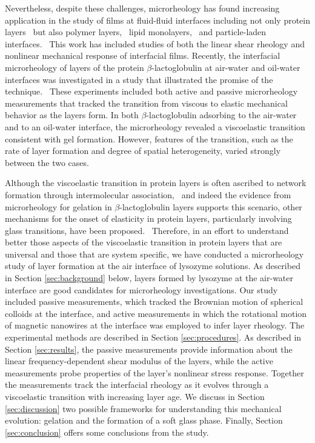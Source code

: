 Nevertheless, despite these challenges, microrheology has found increasing application in the study of films at fluid-fluid interfaces including not only protein layers~\cite{Lee2009, Lee2010, Lee2011, Dhar2010, Prasad2006} but also polymer layers,~\cite{Helfer2001, Kandar2010, Maestro2011} lipid monolayers,~\cite{Sickert2007, Choi2011, Kim2011, Park2011, Murakami2010} and particle-laden interfaces.~\cite{Wu2009a, Langer2012}  This work has included studies of both the linear shear rheology and nonlinear mechanical response of interfacial films.  Recently, the interfacial microrheology of layers of the protein $\beta$-lactoglobulin  at air-water and oil-water interfaces was investigated in a study that illustrated the promise of the technique.~\cite{Lee2010, Lee2011}  These experiments included both active and passive microrheology measurements that tracked the transition from viscous to elastic mechanical behavior as the layers form.  In both $\beta$-lactoglobulin adsorbing to the air-water and to an oil-water interface, the microrheology revealed a viscoelastic transition consistent with gel formation.  However, features of the transition, such as the rate of layer formation and degree of spatial heterogeneity, varied strongly between the two cases.~\cite{Lee2010, Lee2011} 

Although the viscoelastic transition in protein layers is often ascribed to network formation through intermolecular association,~\cite{Bos2001, Murray2002, Martin2002, Bantchev2003, Roberts2005, Murray2011a} and indeed the evidence from microrheology for gelation in $\beta$-lactoglobulin layers supports this scenario, other mechanisms for the onset of elasticity in  protein layers, particularly involving glass transitions, have been proposed.~\cite{Wierenga2006, Cicuta2005, Cicuta2003, Cicuta2007}  Therefore, in an effort to understand better those aspects of the viscoelastic transition in protein layers that are universal and those that are system specific, we have conducted a microrheology study of layer formation at the air interface of lysozyme solutions. As described in Section \ref{sec:background} below, layers formed by lysozyme at the air-water interface are good candidates for microrheology investigations.  Our study included passive measurements, which tracked the Brownian motion of spherical colloids at the interface, and active measurements in which the rotational motion of magnetic nanowires at the interface was employed to infer layer rheology.  The experimental methods are described in Section \ref{sec:procedures}.  As described in Section \ref{sec:results}, the passive measurements provide information about the linear frequency-dependent shear modulus of the layers, while the active measurements probe properties of the layer's nonlinear stress response.  Together the measurements track the interfacial rheology as it evolves through a viscoelastic transition with increasing layer age.  We discuss in Section \ref{sec:discussion} two possible frameworks for understanding this mechanical evolution:  gelation and the formation of a soft glass phase.  Finally, Section \ref{sec:conclusion} offers some conclusions from the study.



